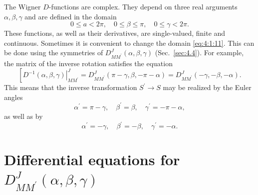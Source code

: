 The Wigner $D$-functions are complex. They depend on three real arguments $\alpha, \beta, \gamma$ and are defined in the domain
\begin{equation}
0 \leq a<2 \pi, \quad 0 \leq \beta \leq \pi, \quad 0 \leq \gamma<2 \pi .\label{eq:4:1:11}
\end{equation}
These functions, as well as their derivatives, are single-valued, finite and continuous. Sometimes it is convenient to change the domain \eqref{eq:4:1:11}. This can be done using the symmetries of $D_{M M^{\prime}}^{J}(\alpha, \beta, \gamma)$ (Sec.~\ref{sec:4.4}). For example, the matrix of the inverse rotation satisfies the equation
\begin{equation}
\left[\left.D^{-1}(\alpha, \beta, \gamma)\right|_{M M^{\prime}} ^{J}=D_{M M^{\prime}}^{J}(\pi-\gamma, \beta,-\pi-\alpha)=D_{M M^{\prime}}^{J}(-\gamma,-\beta,-\alpha) .\right. \label{eq:4:1:12}
\end{equation}
This means that the inverse transformation $S^{\prime} \rightarrow S$ may be realized by the Euler angles
\begin{equation}
\alpha^{\prime}=\pi-\gamma, \quad \beta^{\prime}=\beta, \quad \gamma^{\prime}=-\pi-\alpha, \label{eq:4:1:13}
\end{equation}
as well as by
\begin{equation}
\alpha^{\prime}=-\gamma, \quad \beta^{\prime}=-\beta, \quad \gamma^{\prime}=-\alpha. \label{eq:4:1:14}
\end{equation}
\section{Differential equations for $D_{M M^{\prime}}^{J}(\alpha, \beta, \gamma)$}\label{sec:4.2}
